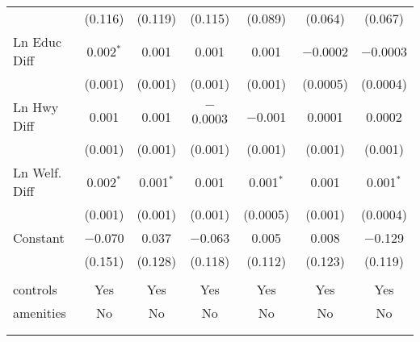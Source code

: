 \begin{table}[!htbp]
\begin{tabular}{@{\extracolsep{5pt}}lcccccc}
  & (0.116) & (0.119) & (0.115) & (0.089) & (0.064) & (0.067) \\ 
  Ln Educ Diff & 0.002$^{*}$ & 0.001 & 0.001 & 0.001 & $-$0.0002 & $-$0.0003 \\ 
  & (0.001) & (0.001) & (0.001) & (0.001) & (0.0005) & (0.0004) \\ 
  Ln Hwy Diff & 0.001 & 0.001 & $-$0.0003 & $-$0.001 & 0.0001 & 0.0002 \\ 
  & (0.001) & (0.001) & (0.001) & (0.001) & (0.001) & (0.001) \\ 
  Ln Welf. Diff & 0.002$^{*}$ & 0.001$^{*}$ & 0.001 & 0.001$^{*}$ & 0.001 & 0.001$^{*}$ \\ 
  & (0.001) & (0.001) & (0.001) & (0.0005) & (0.001) & (0.0004) \\ 
  Constant & $-$0.070 & 0.037 & $-$0.063 & 0.005 & 0.008 & $-$0.129 \\ 
  & (0.151) & (0.128) & (0.118) & (0.112) & (0.123) & (0.119) \\ 
 \hline \\[-1.8ex] 
controls & Yes & Yes & Yes & Yes & Yes & Yes \\ 
amenities & No & No & No & No & No & No \\ 
\hline \\[-1.8ex] 
\hline 
\hline \\[-1.8ex] 
\end{tabular} 
\end{table} 
